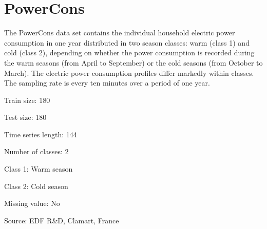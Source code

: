 \chapter{Power\+Cons}
\hypertarget{md_external_2data_2UCRArchive__2018_2PowerCons_2README}{}\label{md_external_2data_2UCRArchive__2018_2PowerCons_2README}
\label{md_external_2data_2UCRArchive__2018_2PowerCons_2README_autotoc_md183}%
%
 The Power\+Cons data set contains the individual household electric power consumption in one year distributed in two season classes\+: warm (class 1) and cold (class 2), depending on whether the power consumption is recorded during the warm seasons (from April to September) or the cold seasons (from October to March). The electric power consumption profiles differ markedly within classes. The sampling rate is every ten minutes over a period of one year.

Train size\+: 180

Test size\+: 180

Time series length\+: 144

Number of classes\+: 2
\begin{DoxyItemize}
\item Class 1\+: Warm season
\item Class 2\+: Cold season
\end{DoxyItemize}

Missing value\+: No

Source\+: EDF R\&D, Clamart, France 